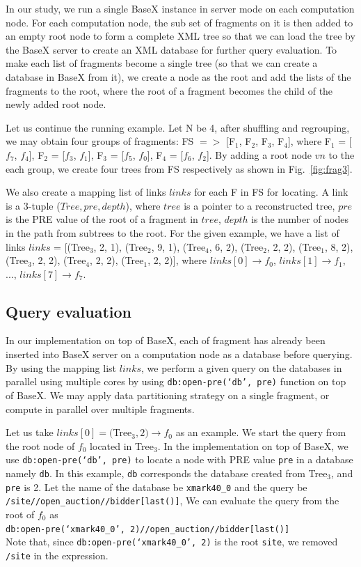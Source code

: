 In our study, we run a single BaseX instance in server mode on each computation
node. For each computation node, the sub set of fragments on it is then added to
an empty root node to form a complete XML tree so that we can load the tree by
the BaseX server to create an XML database for further query evaluation. To make
each list of fragments become a single tree (so that we can create a database in
BaseX from it),  we create a node as the root and add the lists of the fragments
to the root, where the root of a fragment becomes the child of the newly added
root node. 

Let us continue the running example. Let N be 4, after shuffling and regrouping,
we may obtain four groups of fragments: FS $=>$ [F$_1$, F$_2$, F$_3$, F$_4$], where
F$_1$ = [$f_7$, $f_4$],
F$_2$ = [$f_3$, $f_1$],
F$_3$ = [$f_5$, $f_0$],
F$_4$ = [$f_6$, $f_2$].
By adding a root node $vn$ to the each group, we create four trees from FS
respectively as shown in Fig.~\ref{fig:frag3}.

We also create a mapping list of links $links$ for each F in FS for locating.
A link is a 3-tuple ($Tree,
pre, depth$), where $tree$ is a pointer to a reconstructed tree, $pre$ is the PRE
value of the root of a fragment in $tree$, $depth$ is the number of nodes in the
path from subtrees to the root. For the given example, we have a list of links
$links$ =
[(Tree$_3$, 2, 1),
(Tree$_2$, 9, 1),
(Tree$_4$, 6, 2),
(Tree$_2$, 2, 2),
(Tree$_1$, 8, 2),
(Tree$_3$, 2, 2),
(Tree$_4$, 2, 2),
(Tree$_1$, 2, 2)],
where $links[0] \rightarrow f_0$, $links[1] \rightarrow f_1$, ...,  $links[7]
\rightarrow f_7$.

\subsection{Query evaluation}

In our implementation on top of BaseX, each of fragment has already been
inserted into BaseX server on a computation node as a database before querying.
By using the mapping list $links$, we perform a given query on the databases in
parallel using multiple cores by using \texttt{db:open-pre(`db', pre)} function
on top of BaseX. We may apply data partitioning strategy on a single fragment,
or compute in parallel over multiple fragments.

Let us take $links[0] = ($Tree$_3, 2) \rightarrow f_0$ as an example. We start
the query from the root node of $f_0$ located in Tree$_3$. In the implementation
on top of BaseX, we use \texttt{db:open-pre(`db', pre)} to locate a node with
PRE value \texttt{pre} in a database namely \texttt{db}. In this example,
\texttt{db} corresponds the database created from Tree$_3$, and \texttt{pre} is
2. Let the name of the database be \texttt{xmark40\_0} and the query be
\texttt{/site//open\_auction//bidder[last()]}, We can evaluate the query from
the root of $f_0$ as \\ \texttt{db:open-pre(`xmark40\_0',
	2)//open\_auction//bidder[last()]}\\ Note that, since
\texttt{db:open-pre(`xmark40\_0', 2)} is the root \texttt{site}, we removed
\texttt{/site} in the expression.

